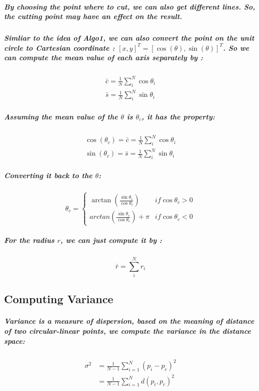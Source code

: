 \documentclass{article}
\begin{document}
\subparagraph{
By choosing the point where to cut, we can also get different lines. So, the cutting point may have an effect on the result.
}

\subparagraph{
Simliar to the idea of \textit{Algo1}, we can also convert the point on the unit circle to Cartesian coordinate : $[x,y]^T = [\cos(\theta), \sin(\theta)]^T$. So we can compute the mean value of each axis separately by :
}

\begin{equation}
\begin{aligned}
\bar{c} = \frac{1}{N} \sum_{i}^{N}\cos{\theta_{i}} \\
\bar{s} = \frac{1}{N} \sum_{i}^{N}\sin{\theta_{i}}
\end{aligned}
\end{equation}

\subparagraph{
Assuming the mean value of the $\theta$ is $\theta_{c}$, it has the property:
}

\begin{equation}
    \begin{aligned}
    \cos(\theta_c) = \bar{c} = \frac{1}{N} \sum_{i}^{N}\cos{\theta_{i}} \\
    \sin(\theta_c) = \bar{s} = \frac{1}{N} \sum_{i}^{N}\sin{\theta_{i}}
    \end{aligned}
\end{equation}

\subparagraph{
Converting it back to the $\theta$:
}

\begin{equation}
\theta_c =
    \begin{cases}
        \arctan{(\frac{\sin{\theta_c}}{\cos{\theta_c}})} &if \cos{\theta_c} >0\\
        arctan{(\frac{\sin{\theta_c}}{\cos{\theta_c}})}+\pi &if \cos{\theta_c} <0
    \end{cases}
\end{equation}

\subparagraph{
For the radius $r$, we can just compute it by :\\
}

\begin{equation}
    \bar{r} = \sum_{i}^{N}r_i
\end{equation}

\subsection{Computing Variance}
\subparagraph{
Variance is a measure of dispersion, based on the meaning of distance of two circular-linear points, we compute the variance in the distance space:
}
\begin{equation}
    \begin{aligned}
    \sigma^2 &= \frac{1}{N-1}\sum_{i=1}^{N}(p_i - p_c)^2\\
            &=\frac{1}{N-1}\sum_{i=1}^{N}d(p_i, p_c)^2
    \end{aligned}
\end{equation}
\end{document}
